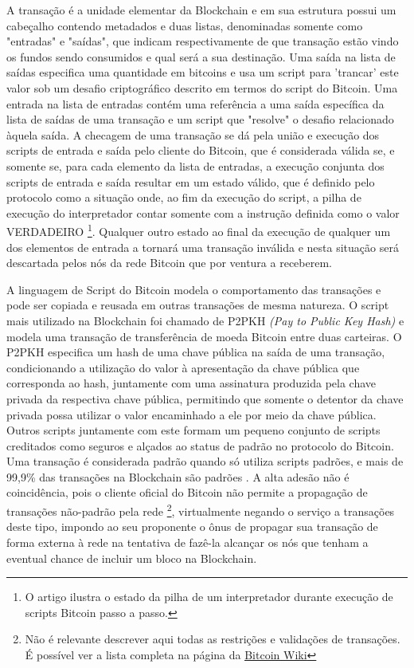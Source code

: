 \documentclass[a4paper,11pt]{article}
\newcommand{\link}[2]{{\color{blue}\underline{\href{#1}{#2}}}}
\begin{document}

A transação é a unidade elementar da Blockchain e em sua estrutura possui um cabeçalho contendo metadados e duas listas, denominadas somente como "entradas" e "saídas", que indicam respectivamente de que transação estão vindo os fundos sendo consumidos e qual será a sua destinação.
Uma saída na lista de saídas especifica uma quantidade em bitcoins e usa um script para 'trancar' este valor sob um desafio criptográfico descrito em termos do script do Bitcoin.
Uma entrada na lista de entradas contém uma referência a uma saída específica da lista de saídas de uma transação e um script que "resolve" o desafio relacionado àquela saída.
A checagem de uma transação se dá pela união e execução dos scripts de entrada e saída pelo cliente do Bitcoin, que é considerada válida se, e somente se, para cada elemento da lista de entradas, a execução conjunta dos scripts de entrada e saída resultar em um estado válido, que é definido pelo protocolo como a situação onde, ao fim da execução do script, a pilha de execução do interpretador contar somente com a instrução definida como o valor VERDADEIRO
\footnote{O artigo \cite{Bistarelli2019} ilustra o estado da pilha de um interpretador durante execução de scripts Bitcoin passo a passo.}.
Qualquer outro estado ao final da execução de qualquer um dos elementos de entrada a tornará uma transação inválida e nesta situação será descartada pelos nós da rede Bitcoin que por ventura a receberem.

A linguagem de Script do Bitcoin modela o comportamento das transações e pode ser copiada e reusada em outras transações de mesma natureza.
O script mais utilizado na Blockchain foi chamado de P2PKH \emph{(Pay to Public Key Hash)} e modela uma transação de transferência de moeda Bitcoin entre duas carteiras.
O P2PKH especifica um hash de uma chave pública na saída de uma transação, condicionando a utilização do valor à apresentação da chave pública que corresponda ao hash, juntamente com uma assinatura produzida pela chave privada da respectiva chave pública, permitindo que somente o detentor da chave privada possa utilizar o valor encaminhado a ele por meio da chave pública.
Outros scripts juntamente com este formam um pequeno conjunto de scripts creditados como seguros e alçados ao status de padrão no protocolo do Bitcoin.
Uma transação é considerada padrão quando só utiliza scripts padrões, e mais de 99,9\% das transações na Blockchain são padrões \cite{Bistarelli2019}.
A alta adesão não é coincidência, pois o cliente oficial do Bitcoin não permite a propagação de transações não-padrão pela
rede
\footnote{
Não é relevante descrever aqui todas as restrições e validações de transações. É possível ver a lista completa na página da \link{https://en.bitcoin.it/wiki/Protocol_rules\#.22tx.22_messages}{Bitcoin Wiki}},
virtualmente negando o serviço a transações deste tipo, impondo ao seu proponente o ônus de propagar sua transação de forma externa à rede na tentativa de fazê-la alcançar os nós que tenham a eventual chance de incluir um bloco na Blockchain.
\end{document}
